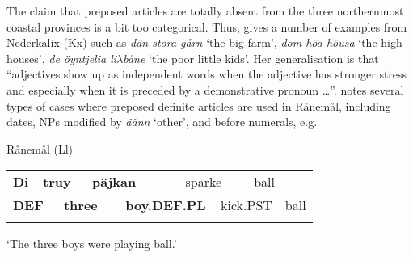 \begin{styleBodytextC}
The claim that preposed articles are totally absent from the three northernmost coastal provinces is a bit too categorical. Thus, \citet[141]{Rutberg1924} gives a number of examples from Nederkalix (Kx) such as \textit{dän stora gårn }‘the big farm’, \textit{dom höa höusa }‘the high houses’, \textit{de öyntjelia li$\lambda $båne }‘the poor little kids’. Her generalisation is that “adjectives show up as independent words when the adjective has stronger stress and especially when it is preceded by a demonstrative pronoun …”. \citet[114]{Wikberg2004} notes several types of cases where preposed definite articles are used in Rånemål, including dates, NPs modified by \textit{äänn} ‘other’, and before numerals, e.g.

\end{styleBodytextC}

\begin{listWWNumileveli}
\item 

\begin{styleExample}
Rånemål (Ll)

\end{styleExample}

\end{listWWNumileveli}

\begin{tabular}{llllllllll}
\lsptoprule
{\bfseries Di} & \multicolumn{2}{l}{{\bfseries truy}

} & \multicolumn{2}{l}{{\bfseries päjkan}

} & \multicolumn{2}{l}{sparke

} & \multicolumn{2}{l}{ball

} & \\
\multicolumn{2}{l}{{\bfseries DEF}

} & \multicolumn{2}{l}{{\bfseries three}

} & \multicolumn{2}{l}{{\bfseries boy.DEF.PL}

} & \multicolumn{2}{l}{kick.PST

} & \multicolumn{2}{l}{ball

}\\
\lspbottomrule
\end{tabular}

\begin{styleTranslation}
‘The three boys were playing ball.’

\end{styleTranslation}

